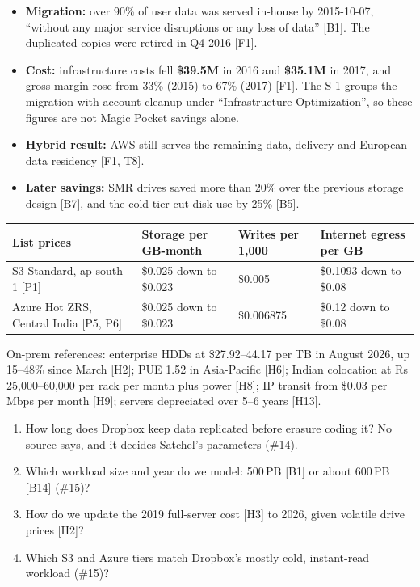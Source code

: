 \documentclass[10pt,a4paper]{article}
\newcommand{\src}[1]{{\color{black!55}\small[#1]}}
\newcommand{\sect}[1]{\vspace{5pt}{\large\bfseries #1}\par\vspace{1pt}}
\begin{document}
\sect{Outcome}
\begin{itemize}
  \item \textbf{Migration:} over 90\% of user data was served in-house by 2015-10-07, ``without any major service disruptions or any loss of data'' \src{B1}. The duplicated copies were retired in Q4 2016 \src{F1}.
  \item \textbf{Cost:} infrastructure costs fell \textbf{\$39.5M} in 2016 and \textbf{\$35.1M} in 2017, and gross margin rose from 33\% (2015) to 67\% (2017) \src{F1}. The S-1 groups the migration with account cleanup under ``Infrastructure Optimization'', so these figures are not Magic Pocket savings alone.
  \item \textbf{Hybrid result:} AWS still serves the remaining data, delivery and European data residency \src{F1, T8}.
  \item \textbf{Later savings:} SMR drives saved more than 20\% over the previous storage design \src{B7}, and the cold tier cut disk use by 25\% \src{B5}.
\end{itemize}

\sect{Inputs for the cost exercise so far}
\begin{tabularx}{\linewidth}{@{}X X X X@{}}
\toprule
List prices & Storage per GB-month & Writes per 1,000 & Internet egress per GB \\
\midrule
S3 Standard, ap-south-1 \src{P1} & \$0.025 down to \$0.023 & \$0.005 & \$0.1093 down to \$0.08 \\
Azure Hot ZRS, Central India \src{P5, P6} & \$0.025 down to \$0.023 & \$0.006875 & \$0.12 down to \$0.08 \\
\bottomrule
\end{tabularx}
\par\vspace{3pt}
On-prem references: enterprise HDDs at \$27.92--44.17 per TB in August 2026, up 15--48\% since March \src{H2}; PUE 1.52 in Asia-Pacific \src{H6}; Indian colocation at Rs 25,000--60,000 per rack per month plus power \src{H8}; IP transit from \$0.03 per Mbps per month \src{H9}; servers depreciated over 5--6 years \src{H13}.

\sect{Open questions for Week 2}
\begin{enumerate}
  \item How long does Dropbox keep data replicated before erasure coding it? No source says, and it decides Satchel's parameters (\#14).
  \item Which workload size and year do we model: 500\,PB \src{B1} or about 600\,PB \src{B14} (\#15)?
  \item How do we update the 2019 full-server cost \src{H3} to 2026, given volatile drive prices \src{H2}?
  \item Which S3 and Azure tiers match Dropbox's mostly cold, instant-read workload (\#15)?
\end{enumerate}
\end{document}
